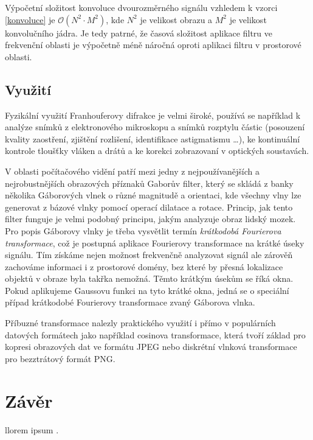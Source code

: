 \documentclass[11pt,a4paper]{article}
\begin{document}
Výpočetní složitost konvoluce dvourozměrného signálu vzhledem k vzorci \ref{konvoluce} je 
$\mathcal{O}(N^2 \cdot M^2)$, kde $N^2$ je velikost obrazu a $M^2$ je velikost konvolučního jádra. Je 
tedy patrné, že časová složitost aplikace filtru ve frekvenční oblasti je výpočetně méně náročná oproti aplikaci 
filtru v prostorové oblasti. 

\subsection{Využití}
Fyzikální využití Franhouferovy difrakce je velmi široké, používá se například k analýze snímků z elektronového 
mikroskopu a snímků rozptylu částic (posouzení kvality zaostření, zjištění rozlišení, identifikace astigmatismu 
\dots), ke kontinuální kontrole tloušťky vláken a drátů a ke korekci zobrazovaní v optických soustavách. 

V oblasti počítačového vidění patří mezi jedny z nejpoužívanějších a nejrobustnějších obrazových příznaků 
Gaborův filter, který se skládá z banky několika Gáborových vlnek o různé magnitudě a orientaci, kde všechny
vlny lze generovat z bázové vlnky pomocí operací dilatace a rotace. Princip, jak tento filter funguje je velmi 
podobný principu, jakým analyzuje obraz lidský mozek. Pro popis Gáborovy vlnky je třeba vysvětlit termín
\textit{krátkodobá Fourierova transformace}, což je postupná aplikace Fourierovy transformace na krátké
úseky signálu. Tím získáme nejen možnost frekvenčně analyzovat signál ale zárověň zachováme informaci i 
z prostorové domény, bez které by přesná lokalizace objektů v obraze byla takřka nemožná. Těmto krátkým
úsekům se říká okna. Pokud aplikujeme Gaussovu funkci na tyto krátké okna, jedná se o speciální případ
krátkodobé Fourierovy transformace zvaný Gáborova vlnka.

Příbuzné transformace nalezly praktického využití i přímo v populárních datových formátech jako například
cosinova transformace, která tvoří základ pro kopresi obrazových dat ve formátu JPEG nebo diskrétní vlnková 
transformace pro bezztrátový formát PNG.

\section{Závěr}
llorem ipsum \cite{pt}.




\end{document}

